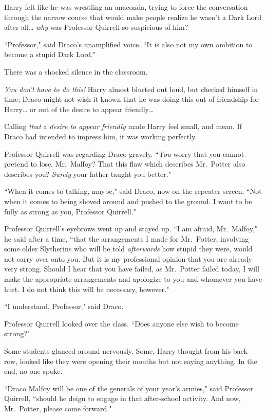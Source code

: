 Harry felt like he was wrestling an anaconda, trying to force the conversation through the narrow course that would make people realize he wasn't a Dark Lord after all{\ldots} \emph{why} was Professor Quirrell so suspicious of him?

``Professor," said Draco's unamplified voice. ``It is also not my own ambition to become a stupid Dark Lord."

There was a shocked silence in the classroom.

\emph{You don't have to do this!} Harry almost blurted out loud, but checked himself in time; Draco might not wish it known that he was doing this out of friendship for Harry{\ldots} or out of the desire to appear friendly{\ldots}

Calling \emph{that} a \emph{desire to appear friendly} made Harry feel small, and mean. If Draco had intended to impress him, it was working perfectly.

Professor Quirrell was regarding Draco gravely. ``\emph{You} worry that you cannot pretend to lose, Mr.~Malfoy? That this flaw which describes Mr.~Potter also describes you? \emph{Surely} your father taught you better."

``When it comes to talking, maybe," said Draco, now on the repeater screen. ``Not when it comes to being shoved around and pushed to the ground. I want to be fully as strong as you, Professor Quirrell."

Professor Quirrell's eyebrows went up and stayed up. ``I am afraid, Mr.~Malfoy," he said after a time, ``that the arrangements I made for Mr.~Potter, involving some older Slytherins who will be told \emph{afterwards} how stupid they were, would not carry over onto you. But it is my professional opinion that you are already very strong. Should I hear that you have failed, as Mr.~Potter failed today, I will make the appropriate arrangements and apologize to you and whomever you have hurt. I do not think this will be necessary, however."

``I understand, Professor," said Draco.

Professor Quirrell looked over the class. ``Does anyone else wish to become strong?"

Some students glanced around nervously. Some, Harry thought from his back row, looked like they were opening their mouths but not saying anything. In the end, no one spoke.

``Draco Malfoy will be one of the generals of your year's armies," said Professor Quirrell, ``should he deign to engage in that after-school activity. And now, Mr.~Potter, please come forward."

